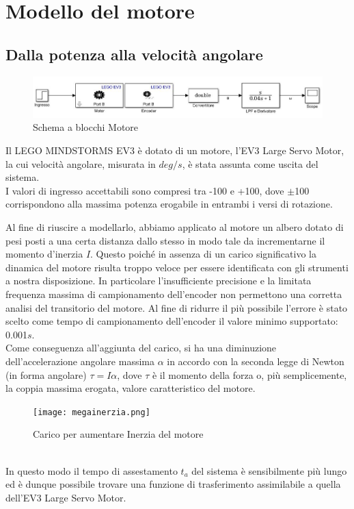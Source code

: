 \chapter{Modello del motore}\label{modMotor}
\section{Dalla potenza alla velocità angolare}
\begin{figure}[ht]
	\centering
	\includegraphics[width=\textwidth]{motoreSimulink.jpg}
	\caption{Schema a blocchi Motore}
	\label{motoreSimulink}
\end{figure}
\noindent Il LEGO MINDSTORMS EV3 è dotato di un motore, l'EV3 Large Servo Motor, la cui velocità angolare, misurata in $deg/s$, è stata assunta come uscita del sistema.\\
I valori di ingresso accettabili sono compresi tra -100 e +100, dove $\pm$100 corrispondono alla massima potenza erogabile in entrambi i versi di rotazione.

Al fine di riuscire a modellarlo, abbiamo applicato al motore un albero dotato di pesi posti a una certa distanza dallo stesso in modo tale da incrementarne il momento d'inerzia $I$. Questo poiché in assenza di un carico significativo la dinamica del motore risulta  troppo veloce per  essere identificata con gli strumenti a nostra disposizione. In particolare l'insufficiente precisione e la limitata frequenza massima di campionamento dell'encoder non permettono una corretta analisi del transitorio del motore. Al fine di ridurre il più possibile l'errore è stato scelto come tempo di campionamento dell'encoder il valore minimo supportato: 0.001$s$.\\
Come conseguenza all'aggiunta del carico, si ha una diminuzione dell'accelerazione angolare massima $\alpha$ in accordo con la seconda legge di Newton (in forma angolare) $\tau = I\alpha$, dove $\tau$ è il momento della forza o, più semplicemente, la coppia massima erogata, valore caratteristico del motore.
\begin{figure}[ht]
	\centering
	\texttt{[image: megainerzia.png]}
	\caption{Carico per aumentare Inerzia del motore}
	\label{megainerzia}
\end{figure}
\\In questo modo il tempo di assestamento $t_a$ del sistema è sensibilmente più lungo ed è dunque possibile trovare una funzione di trasferimento assimilabile a quella dell'EV3 Large Servo Motor.

